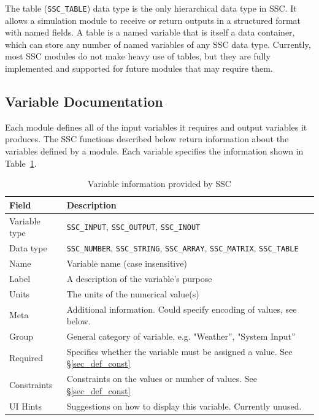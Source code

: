 \documentclass{scrartcl} %
\begin{document}
The table (\texttt{SSC\_TABLE}) data type is the only hierarchical data type in SSC.  It allows a simulation module to receive or return outputs in a structured format with named fields.  A table is a named variable that is itself a data container, which can store any number of named variables of any SSC data type.  Currently, most SSC modules do not make heavy use of tables, but they are fully implemented and supported for future modules that may require them.

\subsection{Variable Documentation}
\label{sec_variable_docs}

Each module defines all of the input variables it requires and output variables it produces. The SSC functions described below return information about the variables defined by a module. Each variable specifies the information shown in Table~\ref{tab_varinfo}.

\begin{table}[ht]
\begin{center}
\begin{tabular}{ll}
Field & Description\\
\hline
Variable type & \texttt{SSC\_INPUT}, \texttt{SSC\_OUTPUT}, \texttt{SSC\_INOUT} \\
Data type & \texttt{SSC\_NUMBER}, \texttt{SSC\_STRING}, \texttt{SSC\_ARRAY}, \texttt{SSC\_MATRIX}, \texttt{SSC\_TABLE} \\
Name & Variable name (case insensitive) \\
Label & A description of the variable's purpose \\
Units & The units of the numerical value(s) \\
Meta & Additional information. Could specify encoding of values, see below. \\
Group & General category of variable, e.g. "Weather'', "System Input'' \\
Required & Specifies whether the variable must be assigned a value. See \S\ref{sec_def_const} \\
Constraints & Constraints on the values or number of values. See \S\ref{sec_def_const} \\
UI Hints & Suggestions on how to display this variable.  Currently unused. \\
\end{tabular}
\caption{Variable information provided by SSC}
\label{tab_varinfo}
\end{center}
\end{table}
\end{document}
